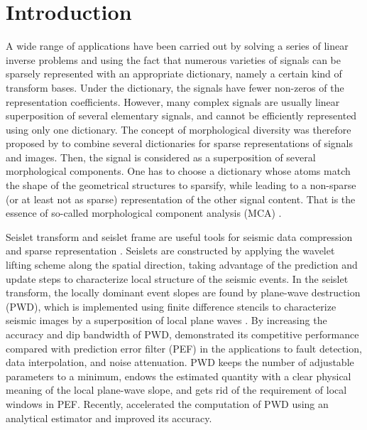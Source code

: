 \section{Introduction}

A wide range of applications have been carried out by solving a series of linear inverse problems and using the fact that numerous varieties of signals can be sparsely represented with an appropriate dictionary, namely a certain kind of transform bases. Under the dictionary, the signals have fewer non-zeros of the representation coefficients. However, many complex signals are usually linear superposition of several elementary signals, and cannot be efficiently represented using only one dictionary. The concept of morphological diversity was therefore proposed by \cite{starck2004redundant,starck2005image} to combine several dictionaries for sparse representations of signals and images. Then, the signal is considered as a superposition of several morphological components. One has to choose a dictionary whose atoms match the shape of the geometrical structures to sparsify, while leading to a non-sparse (or at least not as sparse) representation of the other signal content. That is the essence of so-called morphological component analysis (MCA) \citep{starck2004redundant,starck2007undecimated,woiselle20113}.

Seislet transform and seislet frame are useful tools for seismic data compression and sparse representation \citep{fomel2010seislet}. Seislets are constructed by applying the wavelet lifting scheme \citep{sweldens1998lifting} along the spatial direction, taking advantage of the prediction and update steps to characterize local structure of the seismic events.
In the seislet transform, the locally dominant event slopes are found by plane-wave destruction (PWD), which is implemented using finite difference stencils to characterize seismic images by a superposition of local plane waves \citep{claerbout1992earth}. By increasing the accuracy and dip bandwidth of PWD, \cite{fomel2002applications} demonstrated its competitive performance compared with prediction error filter (PEF) in the applications to fault detection, data interpolation, and noise attenuation. PWD keeps the number of adjustable parameters to a minimum, endows the estimated quantity with a clear physical meaning of the local plane-wave slope, and gets rid of the requirement of local windows in PEF. Recently, \cite{chen2013accelerated,chen2013omnidirectional} accelerated the computation of PWD using an analytical estimator and improved its accuracy.


